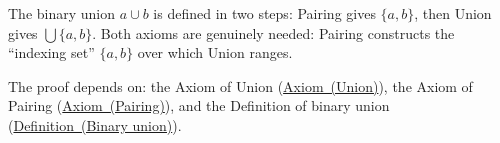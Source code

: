 \begin{remark*}
The binary union $a \cup b$ is defined in two steps: Pairing gives $\{a, b\}$,
then Union gives $\bigcup \{a, b\}$. Both axioms are genuinely needed: Pairing
constructs the ``indexing set'' $\{a, b\}$ over which Union ranges.
\end{remark*}

\begin{remark*}[Dependencies]
The proof depends on: the Axiom of Union (\hyperref[ax:zf-union]{Axiom~(Union)}),
the Axiom of Pairing (\hyperref[ax:vn-pairing]{Axiom~(Pairing)}), and the
Definition of binary union (\hyperref[def:binary-union]{Definition~(Binary union)}).
\end{remark*}
